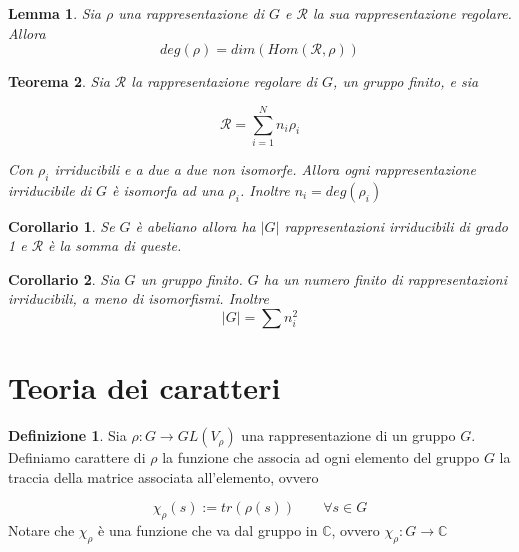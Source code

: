 \documentclass[11pt]{article}
\theoremstyle{plain}
\newtheorem{thm}{Teorema}[section]
\newtheorem{lemma}[thm]{Lemma}
\newtheorem*{cor}{Corollario}
\theoremstyle{definition}
\newtheorem{defn}{Definizione}[section]
\theoremstyle{remark}
\newcommand{\C}{\mathbb{C}}
\newcommand{\dsum}{\displaystyle\sum}
\begin{document}
\begin{lemma}
Sia $\rho$ una rappresentazione di $G$ e $\mathcal{R}$ la sua rappresentazione regolare. Allora 
\[deg(\rho) = dim(Hom(\mathcal{R}, \rho))\]
\end{lemma}




\begin{thm}
Sia $\mathcal{R}$ la rappresentazione regolare di $G$, un gruppo finito, e sia 

\[ \mathcal{R} = \dsum_{i=1}^Nn_i \rho_i\]

Con $\rho_i$ irriducibili e a due a due non isomorfe. Allora ogni rappresentazione irriducibile di $G$ è isomorfa ad una $\rho_i$. Inoltre $n_i = deg(\rho_i)$ 
\label{thm: teorema importantissimo}
\end{thm}



\begin{cor}
Se $G$ è abeliano allora ha $|G|$ rappresentazioni irriducibili di grado 1 e $\mathcal{R}$ è la somma di queste.
\end{cor}



\begin{cor}
Sia $G$ un gruppo finito. $G$ ha un numero finito di rappresentazioni irriducibili, a meno di isomorfismi. Inoltre
\[|G| = \dsum n_i^2\]
\end{cor}



















\newpage
\section{Teoria dei caratteri}


\begin{defn}
Sia $\rho: G \to GL(V_\rho)$ una rappresentazione di un gruppo $G$. Definiamo carattere di $\rho$ la funzione che associa ad ogni elemento del gruppo $G$ la traccia della matrice associata all'elemento, ovvero

\[\chi_\rho(s) := tr (\rho(s)) \qquad \forall s \in G \]
Notare che $\chi_{\rho}$ è una funzione che va dal gruppo in $\C$, ovvero $\chi_{\rho}: G \to \C$

\end{defn}
\end{document}

